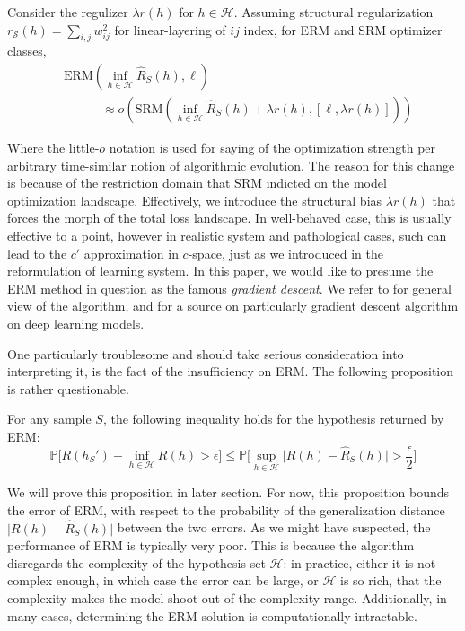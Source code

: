\begin{conjecture}
    Consider the regulizer $\lambda r(h)$ for $h\in\mathcal{H}$. Assuming structural regularization $r_{\mathcal{S}}(h)=\sum_{i,j}w_{ij}^{2}$ for linear-layering of $ij$ index, for ERM and SRM optimizer classes, 
    \begin{equation}
    \begin{split}
        &\mathrm{ERM}\left(\inf_{h\in\mathcal{H}} \hat{R}_{S}(h), \ell\right)\\
        &\quad \quad \quad \approx o\left(\mathrm{SRM}\left(\inf_{h\in\mathcal{H}} \hat{R}_{S}(h) + \lambda r(h), [\ell ,\lambda r(h)]\right)\right)
    \end{split}
\end{equation}
\end{conjecture}

Where the little-$o$ notation is used for saying of the optimization strength per arbitrary time-similar notion of algorithmic evolution. The reason for this change is because of the restriction domain that $\mathrm{SRM}$ indicted on the model optimization landscape. Effectively, we introduce the structural bias $\lambda r(h)$ that forces the morph of the total loss landscape. In well-behaved case, this is usually effective to a point, however in realistic system and pathological cases, such can lead to the $c'$ approximation in $c$-space, just as we introduced in the reformulation of learning system. In this paper, we would like to presume the ERM method in question as the famous \textit{gradient descent}. We refer to \cite{achlioptas_stochastic_nodate,ruder_overview_2017} for general view of the algorithm, and \cite{zhang_gradient_2019} for a source on particularly gradient descent algorithm on deep learning models. 

One particularly troublesome and should take serious consideration into interpreting it, is the fact of the insufficiency on ERM. The following proposition is rather questionable. 
\begin{proposition}
    For any sample $S$, the following inequality holds for the hypothesis returned by ERM: 
    \begin{equation}
        \mathbb{P}\Big[R(h_{S}')- \inf_{h\in \mathcal{H}}R(h) > \epsilon\Big] \leq \mathbb{P}\Big[ \sup_{h\in \mathcal{H}} \lvert R(h)- \hat{R}_{S}(h) \rvert > \frac{\epsilon}{2} \Big]
    \end{equation}
\end{proposition}
We will prove this proposition in later section. For now, this proposition bounds the error of ERM, with respect to the probability of the generalization distance $\lvert R(h)- \hat{R}_{S}(h)\rvert$ between the two errors. As we might have suspected, the performance of ERM is typically very poor. This is because the algorithm disregards the complexity of the hypothesis set $\mathcal{H}$: in practice, either it is not complex enough, in which case the error can be large, or $\mathcal{H}$ is so rich, that the complexity makes the model shoot out of the complexity range. Additionally, in many cases, determining the ERM solution is computationally intractable. 

